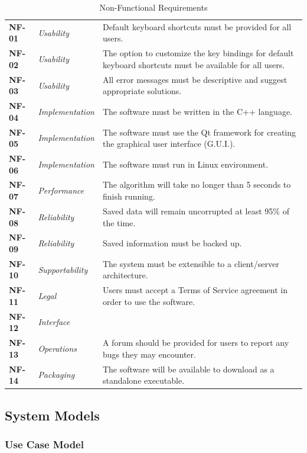 \documentclass[12pt,letterpaper]{article}
\begin{document}
\begin{table}[H]
	\caption{Non-Functional Requirements}
	\vspace{1em}
	\begin{tabu} to 
		NF-01 & Usability & Default keyboard shortcuts must be provided for all users. \\
		NF-02 & Usability & The option to customize the key bindings for default keyboard shortcuts must be available for all users.\\
		NF-03 & Usability & All error messages must be descriptive and suggest appropriate solutions.\\
		NF-04 & Implementation & The software must be written in the C++ language. \\
		NF-05 & Implementation & The software must use the Qt framework for creating the graphical user interface (G.U.I.). \\
		NF-06 & Implementation & The software must run in Linux environment. \\
		NF-07 & Performance & The algorithm will take no longer than 5 seconds to finish running. \\
		NF-08 & Reliability & Saved data will remain uncorrupted at least 95\% of the time. \\
		NF-09 & Reliability & Saved information must be backed up. \\
		NF-10 & Supportability & The system must be extensible to a client/server architecture. \\
		NF-11 & Legal & Users must accept a Terms of Service agreement in order to use the software.\\
		NF-12 & Interface & \\
		NF-13 & Operations & A forum should be provided for users to report any bugs they may encounter. \\
		NF-14 & Packaging & The software will be available to download as a standalone executable. \\
	\end{tabu}
\end{table}

\subsection{System Models}

\subsubsection{Use Case Model}
\end{document}
